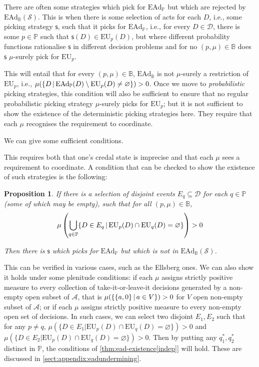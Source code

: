\documentclass[a4paper]{article}
\newtheorem{proposition}[theorem]{Proposition}
\newcommand\A{\mathcal{A}}
\renewcommand\P{\mathbb{P}} %
\newcommand\EU{\mathrm{EU}}
\newcommand\EAd{\mathrm{EAd}}
\newcommand{\Decs}{\mathcal{D}}
\renewcommand\S{\mathcal{S}}
\newcommand\s{\mathsf{s}}
\newcommand{\IB}{\mathbb{B}}
\newcommand{\IP}{\P}
\renewcommand{\color}[1]{}
\newenvironment{colored}[1]{\leavevmode\color{#1}}{}
\newcommand{\Strategies}{\S}
\newcommand\SetDelimiter[1][]{
	\nonscript\,#1\vert \allowbreak \nonscript\,\mathopen{}}
\providecommand\given{\SetDelimiter}
\renewcommand{\emptyset}{\varnothing}
\newenvironment{CCM rewritten}
{\begingroup\color{blue}} %
{\endgroup}              %
\begin{document}
\begin{colored}{violet}
	
There are often some strategies which pick for $\EAd_\IP$ but which are rejected by $\EAd_\IB(\Strategies)$. 
This is when there is some selection of acts for each $D$, i.e., some picking strategy $\s$, such that it picks for $\EAd_\IP$, i.e., for every $D\in\Decs$, there is some $p\in\IP$ such that $\s(D)\in\EU_p(D)$, but where different probability functions rationalise $\s$ in different decision problems and for no $(p,\mu)\in\IB$ does $\s$ $\mu$-surely pick for $\EU_p$. 

This will entail that for every $(p,\mu)\in\IB$, $\EAd_\IB$ is not $\mu$-surely a restriction of $\EU_p$, i.e., $\mu(\{D\given \EAd_\IP(D)\setminus\EU_p(D)\neq\emptyset\})>0$. Once we move to \emph{probabilistic} picking strategies, this condition will also be sufficient to ensure that no regular probabilistic picking strategy $\mu$-surely picks for $\EU_p$; but it is not sufficient to show the existence of the deterministic picking strategies here. They require that each $\mu$ recognises the requirement to coordinate. 

We can give some sufficient conditions. 



This requires both that one's credal state is imprecise and that each $\mu$ sees a requirement to coordinate.
A condition that can be checked to show the existence of such strategies is the following: 
\begin{proposition}\label{thm:ead-existsimpermissible[indep]}
	If there is a selection of disjoint events $E_q\subseteq\Decs$ for each $q\in\IP$ (some of which may be empty), such that for all $(p,\mu)\in\IB$, 
	\[
	\mu\left(\bigcup_{q\in\IP}\{D\in E_q\given \EU_p(D)\cap\EU_q(D)=\emptyset\}\right)>0
	\]
	
	Then there is $\s$ which picks for $\EAd_\IP$ but which is not in $\EAd_\IB(\S)$. 
\end{proposition}
This can be verified in various cases, such as the Ellsberg ones. 
We can also show it holds under some plenitude conditions: if each $\mu$ assigns strictly positive measure to every collection of take-it-or-leave-it decisions generated by a non-empty open subset of $\A$, that is $\mu(\{\{a,0\}\given a\in V\})>0$ for $V$ open non-empty subset of $\A$; or if each $\mu$ assigns strictly positive measure to every non-empty open set of decisions. In such cases, we can select two disjoint $E_1,E_2$ such that for any $p\neq q$, $\mu(\{D\in E_1|\EU_p(D)\cap \EU_q(D)=\emptyset\})>0$ and $\mu(\{D\in E_2|\EU_p(D)\cap \EU_q(D)=\emptyset\})>0$. Then by putting any $q^*_1,q^*_2$ distinct in $\IP$, the conditions of \cref{thm:ead-existence[indep]} will hold. These are discussed in \cref{sect:appendix:eadundermining}.

\end{colored}
\end{document}
